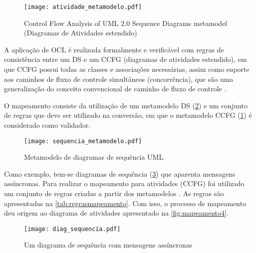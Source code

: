\begin{figure}[h!]
	\centering
	\texttt{[image: atividade\_metamodelo.pdf]}
	\caption{Control Flow Analysis of UML 2.0 Sequence Diagrams metamodel (Diagramas de Atividades estendido) \cite{garousi2005control}}
	\label{fig:mapeamento2}
\end{figure}

A aplicação de OCL é realizada formalmente e verificável com regras de consistência entre um DS e um CCFG (diagramas de atividades estendido), em que CCFG possui todas as classes e associações necessárias, assim como suporte aos caminhos de fluxo de controle simultâneos (concorrência), que são uma generalização do conceito convencional de caminho de fluxo de controle \cite{garousi2005control}. 

O mapeamento consiste da utilização de um metamodelo DS (\ref{fig:mapeamento3}) e um conjunto de regras que deve ser utilizado na conversão, em que o metamodelo CCFG (\ref{fig:mapeamento2}) é considerado como validador.

\begin{figure}[h!]
	\centering
	\texttt{[image: sequencia\_metamodelo.pdf]}
	\caption{Metamodelo de diagramas de sequência UML \cite{garousi2005control}}
	\label{fig:mapeamento3}
\end{figure}

Como exemplo, tem-se diagramas de sequência (\ref{fig:mapeamento1}) que aparenta mensagens assíncronas. Para realizar o mapeamento para atividades (CCFG) foi utilizado um conjunto de regras criadas a partir dos metamodelos \cite{garousi2005control}. As regras são apresentadas na \ref{tab:regrasmapeamento}. Com isso, o processo de mapeamento deu origem ao diagrama de atividades apresentado na \ref{fig:mapeamento4}.   

\begin{figure}[h!]
	\centering
	\texttt{[image: diag\_sequencia.pdf]}
	\caption{Um diagrama de sequência com mensagens assíncronas \cite{garousi2005control}}
	\label{fig:mapeamento1}
\end{figure}


